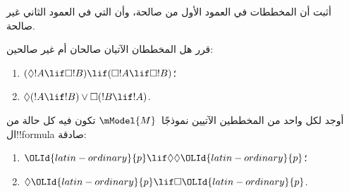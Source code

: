 \documentclass[../../../include/open-logic-section]{subfiles}
\begin{document}
\begin{prob}%
  أثبت أن المخططات في العمود الأول من
   صالحة، وأن التي في
  العمود الثاني غير صالحة.
\end{prob}

\begin{prob}
  قرر هل المخططان الآتيان صالحان أم غير صالحين:
  \begin{enumerate}
  \item $(\Diamond !A \lif \Box !B) \lif (\Box !A \lif \Box
    !B)$؛
  \item $\Diamond(!A \lif !B) \lor \Box(!B \lif !A)$.
  \end{enumerate}
\end{prob}

\begin{prob}
  أوجد لكل واحد من المخططين الآتيين نموذجًا~$\mModel{M}$ تكون فيه كل
  حالة من ال!!{formula} صادقة:
  \begin{enumerate}
  \item $\OLId{latin-ordinary}{p} \lif \Diamond\Diamond \OLId{latin-ordinary}{p}$؛
  \item $\Diamond \OLId{latin-ordinary}{p} \lif \Box \OLId{latin-ordinary}{p}$.
  \end{enumerate}
\end{prob}
\end{document}
